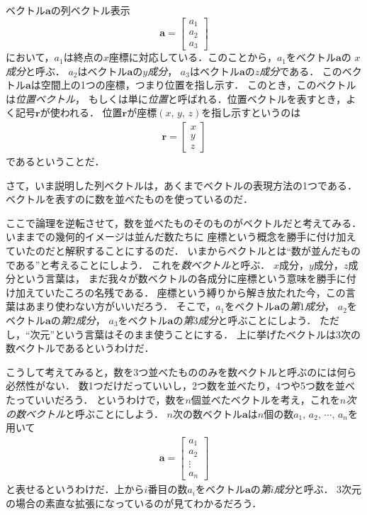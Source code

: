 ベクトル$\bm{a}$の列ベクトル表示
$$
\bm{a} = \left[
 \begin{array}{c}
    a_1 \\
    a_2 \\
    a_3
 \end{array}
           \right]
$$
において，$a_1$は終点の$x$座標に対応している．このことから，$a_1$をベクトル$\bm{a}$の
\emph{$x$成分}と呼ぶ．
$a_2$はベクトル$\bm{a}$の\emph{$y$成分}，
$a_3$はベクトル$\bm{a}$の\emph{$z$成分}である．
このベクトル$\bm{a}$は空間上の1つの座標，つまり位置を指し示す．
このとき，このベクトルは\emph{位置ベクトル}，
もしくは単に\emph{位置}と呼ばれる．位置ベクトルを表すとき，よく記号$\bm{r}$が使われる．
位置$\bm{r}$が座標$(x, \, y, \, z)$を指し示すというのは
\begin{align}
\bm{r} = \left[
 \begin{array}{c}
  x \\
  y \\ 
  z 
 \end{array}
   \right]
\label{eq:itivec}
\end{align}
であるということだ．

さて，いま説明した列ベクトルは，あくまでベクトルの表現方法の1つである．
ベクトルを表すのに数を並べたものを使っているのだ．

ここで論理を逆転させて，数を並べたものそのものがベクトルだと考えてみる．いままでの幾何的イメージは並んだ数たちに
座標という概念を勝手に付け加えていたのだと解釈することにするのだ．
いまからベクトルとは``数が並んだものである''と考えることにしよう．
これを\emph{数ベクトル}と呼ぶ．
$x$成分，$y$成分，$z$成分という言葉は，
まだ我々が数ベクトルの各成分に座標という意味を勝手に付け加えていたころの名残である．
座標という縛りから解き放たれた今，この言葉はあまり使わない方がいいだろう．
そこで，$a_1$をベクトル$\bm{a}$の\emph{第$1$成分}，
$a_2$をベクトル$\bm{a}$の\emph{第$2$成分}，
$a_3$をベクトル$\bm{a}$の\emph{第$3$成分}と呼ぶことにしよう．
ただし，``次元''という言葉はそのまま使うことにする．
上に挙げたベクトルは3次の数ベクトルであるというわけだ．

こうして考えてみると，数を3つ並べたもののみを数ベクトルと呼ぶのには何ら必然性がない．
数1つだけだっていいし，2つ数を並べたり，4つや5つ数を並べたっていいだろう．
というわけで，数を$n$個並べたベクトルを考え，これを\emph{$n$次の数ベクトル}と呼ぶことにしよう．
$n$次の数ベクトル$\bm{a}$は$n$個の数$a_1, \, a_2, \, \cdots , \, a_n$を用いて
\begin{align}
\bm{a} = \left[
 \begin{array}{c}
   a_1 \\
   a_2 \\
   \vdots \\
   a_n 
 \end{array}
            \right]
\label{eq:vecnd}
\end{align}
と表せるというわけだ．上から$i$番目の数$a_i$をベクトル$\bm{a}$の\emph{第$i$成分}と呼ぶ．
3次元の場合の素直な拡張になっているのが見てわかるだろう．

